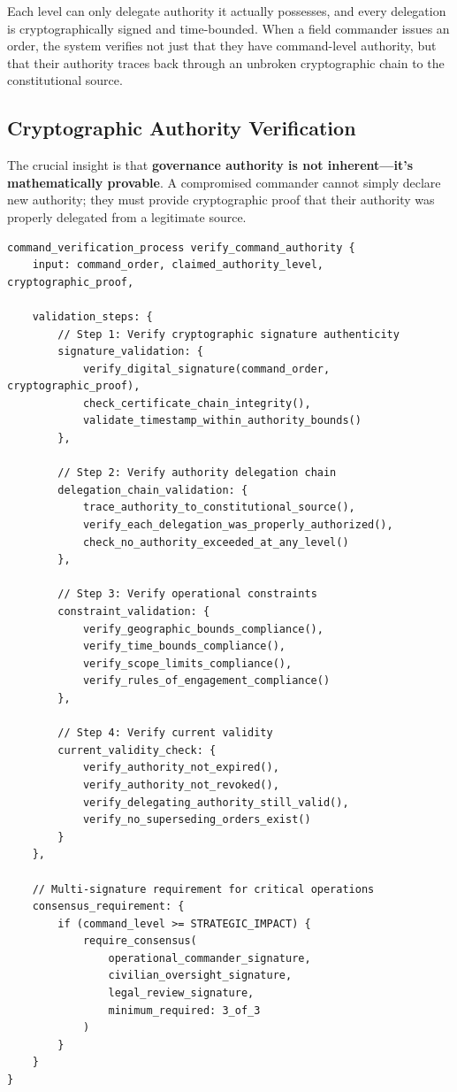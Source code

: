 Each level can only delegate authority it actually possesses, and every delegation is cryptographically signed and time-bounded. When a field commander issues an order, the system verifies not just that they have command-level authority, but that their authority traces back through an unbroken cryptographic chain to the constitutional source.

\subsection{Cryptographic Authority Verification}

The crucial insight is that \textbf{governance authority is not inherent—it's mathematically provable}. A compromised commander cannot simply declare new authority; they must provide cryptographic proof that their authority was properly delegated from a legitimate source.

\begin{lstlisting}[language=rift, caption=Authority Verification Process]
command_verification_process verify_command_authority {
    input: command_order, claimed_authority_level, cryptographic_proof,
    
    validation_steps: {
        // Step 1: Verify cryptographic signature authenticity
        signature_validation: {
            verify_digital_signature(command_order, cryptographic_proof),
            check_certificate_chain_integrity(),
            validate_timestamp_within_authority_bounds()
        },
        
        // Step 2: Verify authority delegation chain
        delegation_chain_validation: {
            trace_authority_to_constitutional_source(),
            verify_each_delegation_was_properly_authorized(),
            check_no_authority_exceeded_at_any_level()
        },
        
        // Step 3: Verify operational constraints
        constraint_validation: {
            verify_geographic_bounds_compliance(),
            verify_time_bounds_compliance(),
            verify_scope_limits_compliance(),
            verify_rules_of_engagement_compliance()
        },
        
        // Step 4: Verify current validity
        current_validity_check: {
            verify_authority_not_expired(),
            verify_authority_not_revoked(),
            verify_delegating_authority_still_valid(),
            verify_no_superseding_orders_exist()
        }
    },
    
    // Multi-signature requirement for critical operations
    consensus_requirement: {
        if (command_level >= STRATEGIC_IMPACT) {
            require_consensus(
                operational_commander_signature,
                civilian_oversight_signature,
                legal_review_signature,
                minimum_required: 3_of_3
            )
        }
    }
}
\end{lstlisting}

